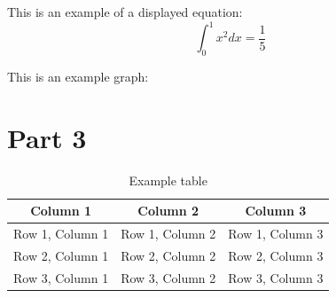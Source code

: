 \documentclass[12pt,a4paper]{report}
\begin{document}
This is an example of a displayed equation:
\begin{equation}
    \int_{0}^{1} x^2 dx = \frac{1}{5}
\end{equation}

This is an example graph:
\begin{center}
\end{center}

\section{Part 3}
\begin{table}[h]
    \centering
    \begin{tabular}{|c|c|c|}
        \hline
        \textbf{Column 1} & \textbf{Column 2} & \textbf{Column 3} \\
        \hline
        Row 1, Column 1   & Row 1, Column 2   & Row 1, Column 3   \\
        \hline
        Row 2, Column 1   & Row 2, Column 2   & Row 2, Column 3   \\
        \hline
        Row 3, Column 1   & Row 3, Column 2   & Row 3, Column 3   \\
        \hline
    \end{tabular}
    \caption{Example table}
\end{table}
\end{document}
